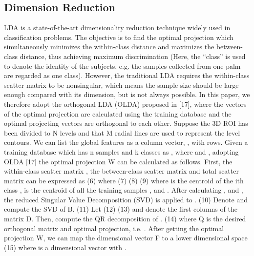 \subsection{Dimension Reduction}
\label{ssec:methodology:lda}

LDA is a state-of-the-art dimensionality reduction technique widely used in classification problems. The objective is to find the optimal projection which simultaneously minimizes the within-class distance and maximizes the between-class distance, thus achieving maximum discrimination (Here, the “class” is used to denote the identity of the subjects, e.g. the samples collected from one palm are regarded as one class). However, the traditional LDA requires the within-class scatter matrix to be nonsingular, which means the sample size should be large enough compared with its dimension, but is not always possible. In this paper, we therefore adopt the orthogonal LDA (OLDA) proposed in [17], where the vectors of the optimal projection are calculated using the training database and the optimal projecting vectors are orthogonal to each other.
Suppose the 3D ROI has been divided to N levels and that M radial lines are used to represent the level contours. We can list the global features as a column vector,  , with   rows. Given a training database which has n samples and k classes as  , where   and  , adopting OLDA [17] the optimal projection W can be calculated as follows.
First, the within-class scatter matrix  , the between-class scatter matrix   and total scatter matrix   can be expressed as
                              (6)
where
                           (7)
                         (8)
                                         (9)
where   is the centroid of the ith class  ,   is the centroid of all the training samples ,   and  .
After calculating  ,   and  , the reduced Singular Value Decomposition (SVD) is applied to  .
                                     (10)
Denote   and compute the SVD of B.
                                          (11)
Let
                                              (12)
                                              (13)
and denote   the first   columns of the matrix D. Then, compute the QR decomposition of  .
                                    (14)
where Q is the desired orthogonal matrix and optimal projection, i.e.  .
After getting the optimal projection W, we can map the   dimensional vector F to a lower dimensional space
                                             (15)
where   is a   dimensional vector with  .
